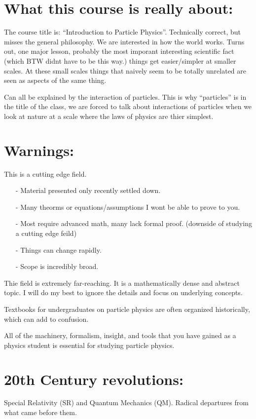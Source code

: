 {\fontsize{14}{16}\selectfont

\section{What this course is really about:}
The course title is: ``Introduction to Particle Physics''.
Technically correct, but misses the general philosophy. 
We are interested in how the world works. 
Turns out, one major lesson, probably the most imporant interesting scientific fact (which BTW didnt have to be this way.) things get easier/simpler at smaller scales. 
At these small scales things that naively seem to be totally unrelated are seen as aspects of the same thing. 

Can all be explained by the interaction of particles. 
This is why ``particles'' is in the title of the class, we are forced to talk about interactions of particles when we look at nature at a scale where the laws of physics are thier simplest. 

\section{Warnings:}
This is a cutting edge field. 
\begin{itemize}
\item[-] Material presented only recently settled down. 
\item[-] Many theorms or equations/assumptions I wont be able to prove to you. 
\item[-] Most require advanced math, many lack formal proof.  (downside of studying a cutting edge feild)
\item[-] Things can change rapidly. 
\item[-] Scope is incredibly broad. 
\end{itemize}

Thie field is extremely far-reaching. 
It is a mathematically dense and abstract topic. 
I will do my best to ignore the details and focus on underlying concepts.

Textbooks for undergraduates on particle physics are often organized historically, which can add to confusion. 

All of the machinery, formalism, insight, and tools that you have gained as a physics student is essential for studying particle physics.


\section{20th Century revolutions:}
Special Relativity (SR) and Quantum Mechanics (QM).
Radical departures from what came before them.

}
